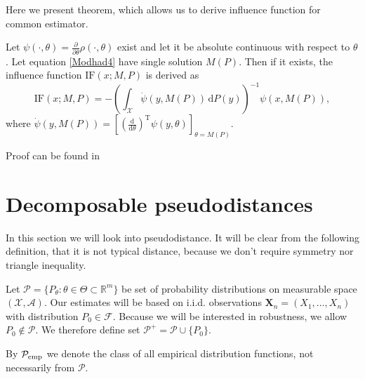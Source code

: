 Here we present theorem, which allows us to derive influence function for common \ren estimator.
\begin{theorem} 
Let $\psi(\cdot,\theta) =  \frac{\partial}{\partial \theta} \rho(\cdot,\theta)$ exist and let it be absolute continuous with respect to $\theta$. Let equation \eqref{Modhad4} have single solution $M(P)$. Then if it exists, the influence function $\mathrm{IF}(x;M,P)$ is derived as
\begin{equation}
 \text{IF}(x;M,P) = -\left(\int_{\mathcal{X}} \dot{\psi} (y,M(P)) \, \mathrm{d}P(y)\right)^{-1} \psi(x,M(P)),
\end{equation}
where $\dot{\psi} (y,M(P)) = \left[\left(\frac{\mathrm{d}}{\mathrm{d}\theta}\right)^\mathrm{T}\psi(y,\theta)\right]_{\theta = M(P)}$.
\label{theo:IF}
\end{theorem}
Proof can be found in \cite{Demut2010}

\section{Decomposable pseudodistances}

In this section we will look into \ren pseudodistance. It will be clear from the following definition, that it is not typical distance, because we don't require symmetry nor triangle inequality. 

Let $\mathcal{P} = \lbrace P_\theta : \theta \in \Theta \subset \mathbb{R}^m \rbrace$ be set of probability distributions on measurable space $(\mathcal{X, A})$. Our estimates will be based on i.i.d. observations $\mathbf{X}_n = (X_1, \ldots ,X_n)$ with distribution $P_{0} \in \mathcal{F}$. Because we will be interested in robustness, we allow $P_{0} \not\in \mathcal{P}$. We therefore define set $\mathcal{P}^+ = \mathcal{P} \cup \lbrace P_0 \rbrace$.

By $\mathcal{P}_\mathrm{emp}$ we denote the class of all empirical distribution functions, not necessarily from $\mathcal{P}.$
		
